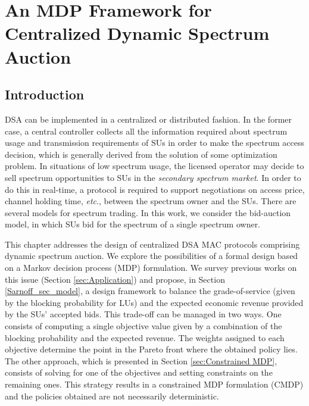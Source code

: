 \graphicspath{ {img/Sarnoff/} }
\chapter{An MDP Framework for Centralized Dynamic Spectrum Auction}\label{Sarnoff_chap}
\section{Introduction}
DSA can be implemented in a centralized or distributed fashion. In the former case, a central controller collects all the information required about spectrum usage and transmission requirements of SUs in order to make the spectrum access decision, which is generally derived from the solution of some optimization problem.
In situations of low spectrum usage, the licensed operator may decide to sell spectrum opportunities to SUs in the \textit{secondary spectrum market}. In order to do this in real-time, a protocol is required to support negotiations on access price, channel holding time, \textit{etc}., between the spectrum owner and the SUs. There are several models for spectrum trading. In this work, we consider the bid-auction model, in which SUs bid for the spectrum of a single spectrum owner.

This chapter addresses the design of centralized DSA MAC protocols comprising dynamic spectrum auction. We explore the possibilities of a formal design based on a Markov decision process (MDP) formulation. We survey previous works on this issue (Section \ref{sec:Application}) and propose, in Section \ref{Sarnoff_sec_model}, a design framework to balance the grade-of-service (given by the blocking probability for LUs) and the expected economic revenue provided by the SUs' accepted bids. This trade-off can be managed in two ways. One consists of computing a single objective value given by a combination of the blocking probability and the expected revenue. The weights assigned to each objective determine the point in the Pareto front where the obtained policy lies. The other approach, which is presented in Section \ref{sec:Constrained MDP}, consists of solving for one of the objectives and setting constraints on the remaining ones.
This strategy results in a constrained MDP formulation (CMDP) and the policies obtained are not necessarily deterministic.


